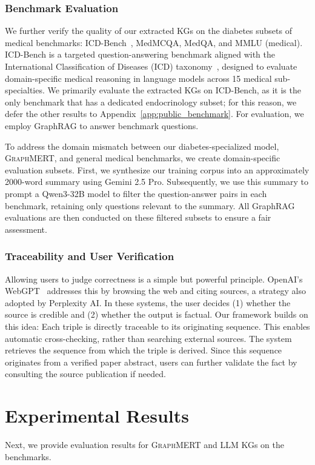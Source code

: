 \documentclass[10pt]{article}
\newcommand{\ours}{\textsc{GraphMERT}\xspace}
\begin{document}
\subsubsection{Benchmark Evaluation} 
\label{subsec:benchmark}
We further verify the quality of our extracted KGs on the diabetes subsets of medical benchmarks: ICD-Bench~\cite{dedhia2025}, MedMCQA, MedQA, and MMLU (medical). ICD-Bench is a targeted question-answering benchmark aligned with the International Classification of Diseases (ICD) taxonomy~\cite{whoICD10}, designed to evaluate domain-specific medical reasoning in language models across 15 medical sub-specialties. We primarily evaluate the extracted KGs on ICD-Bench, as it is the only benchmark that has a dedicated endocrinology subset; for this reason, we defer the other results to Appendix~\ref{app:public_benchmark}. For evaluation, we employ GraphRAG to answer benchmark questions.  

To address the domain mismatch between our diabetes-specialized model, \ours, and general medical benchmarks, we create domain-specific evaluation subsets. First, we synthesize our training corpus into an approximately 2000-word summary using Gemini 2.5 Pro. Subsequently, we use this summary to prompt a Qwen3-32B model to filter the question-answer pairs in each benchmark, retaining only questions relevant to the summary. All GraphRAG evaluations are then conducted on these filtered subsets to ensure a fair assessment.

\subsubsection{Traceability and User Verification} 
Allowing users to judge correctness is a simple but powerful principle. OpenAI’s WebGPT~\cite{nakano2022webgpt} addresses this by browsing the web and citing sources, a strategy also adopted by Perplexity AI. In these systems, the user decides (1) whether the source is credible and (2) whether the output is factual. Our framework builds on this idea: Each triple is directly traceable to its originating sequence. This enables automatic cross-checking, rather than searching external sources. The system retrieves the sequence from which the triple is derived. Since this sequence originates from a verified paper abstract, users can further validate the fact by consulting the source publication if needed.

\section{Experimental Results}
\label{sec:experimental_results}
Next, we provide evaluation results for \ours and LLM KGs on the benchmarks.
\end{document}

